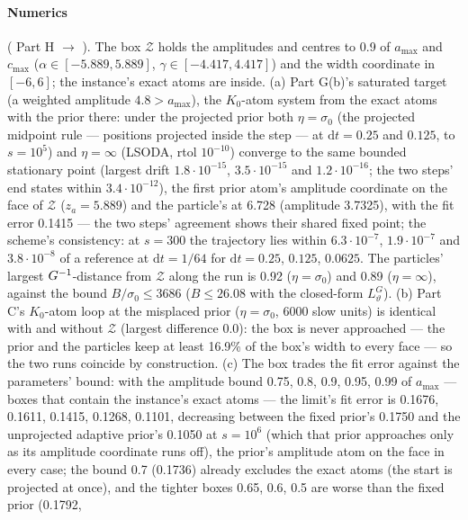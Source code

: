 \paragraph{Numerics} ( Part H $\to$ ). The box
$\mathcal{Z}$ holds the amplitudes and centres to 0.9 of $a_{\max}$ and $c_{\max}$ ($\alpha\in[-5.889,5.889]$,
$\gamma\in[-4.417,4.417]$) and the width coordinate in $[-6,6]$; the instance's exact atoms are inside. (a) Part
G(b)'s saturated target (a weighted amplitude $4.8 > a_{\max}$), the $K_0$-atom system from the exact atoms with the
prior there: under the projected prior both $\eta = \sigma_0$ (the projected midpoint rule --- positions projected
inside the step --- at $\mathrm{d}t = 0.25$ and $0.125$, to $s = 10^5$) and $\eta = \infty$ (LSODA, rtol $10^{-10}$)
converge to the same bounded stationary point (largest drift $1.8\cdot10^{-15}$, $3.5\cdot10^{-15}$ and
$1.2\cdot10^{-16}$; the two steps' end states within $3.4\cdot10^{-12}$), the first prior atom's amplitude coordinate
on the face of $\mathcal{Z}$ ($z_a = 5.889$) and the particle's at 6.728 (amplitude 3.7325), with the fit error
0.1415 --- the two steps' agreement shows their shared fixed point; the scheme's consistency: at $s = 300$ the
trajectory lies within $6.3\cdot10^{-7}$, $1.9\cdot10^{-7}$ and $3.8\cdot10^{-8}$ of a reference at
$\mathrm{d}t = 1/64$ for $\mathrm{d}t = 0.25$, $0.125$, $0.0625$. The particles' largest $G^{-1}$-distance from
$\mathcal{Z}$ along the run is 0.92 ($\eta = \sigma_0$) and 0.89 ($\eta = \infty$), against the bound
$B/\sigma_0\le3686$ ($B\le26.08$ with the closed-form $L_\vartheta^G$). (b) Part C's $K_0$-atom loop at the misplaced
prior ($\eta = \sigma_0$, 6000 slow units) is identical with and without $\mathcal{Z}$ (largest difference 0.0): the
box is never approached --- the prior and the particles keep at least 16.9\% of the box's width to every face --- so
the two runs coincide by construction. (c) The box trades the fit error against the parameters' bound: with the
amplitude bound 0.75, 0.8, 0.9, 0.95, 0.99 of $a_{\max}$ --- boxes that contain the instance's exact atoms --- the
limit's fit error is 0.1676, 0.1611, 0.1415, 0.1268, 0.1101, decreasing between the fixed prior's 0.1750 and the
unprojected adaptive prior's 0.1050 at $s = 10^6$ (which that prior approaches only as its amplitude coordinate runs
off), the prior's amplitude atom on the face in every case; the bound 0.7 (0.1736) already excludes the exact atoms
(the start is projected at once), and the tighter boxes 0.65, 0.6, 0.5 are worse than the fixed prior (0.1792,
